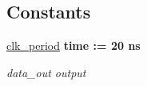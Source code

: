 \subsection*{Constants}
 \begin{DoxyCompactItemize}
\item 
\hyperlink{classtb__flip__flop_1_1behavior_a608ca2ccf8923ddf0eee96f9c7d0e712}{clk\+\_\+period} {\bfseries \textcolor{vhdlchar}{time}\textcolor{vhdlchar}{ }\textcolor{vhdlchar}{ }\textcolor{vhdlchar}{\+:}\textcolor{vhdlchar}{=}\textcolor{vhdlchar}{ }\textcolor{vhdlchar}{ }\textcolor{vhdlchar}{ } \textcolor{vhdldigit}{20} \textcolor{vhdlchar}{ }\textcolor{vhdlchar}{ns}\textcolor{vhdlchar}{ }} 
\begin{DoxyCompactList}\small\item\em data\+\_\+out output \end{DoxyCompactList}\end{DoxyCompactItemize}
